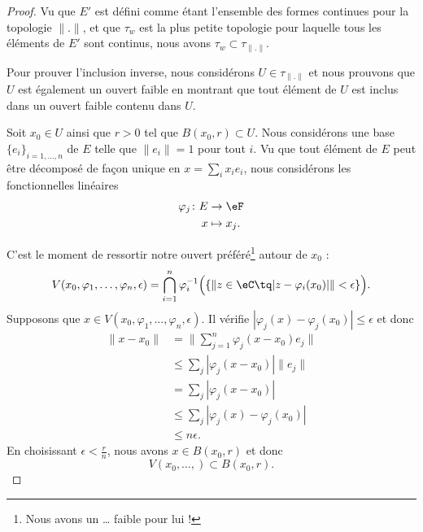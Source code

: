 \begin{proof}
	Vu que \( E'\) est défini comme étant l'ensemble des formes continues pour la topologie \( \| . \|\), et que \( \tau_w\) est la plus petite topologie pour laquelle tous les éléments de \( E'\) sont continus, nous avons \( \tau_w\subset\tau_{\| . \|}\).

	Pour prouver l'inclusion inverse, nous considérons \( U\in\tau_{\| . \|}\) et nous prouvons que \( U\) est également un ouvert faible en montrant que tout élément de $U$ est inclus dans un ouvert faible contenu dans \( U\).


	Soit \( x_0\in U\) ainsi que \( r>0\) tel que \( B(x_0,r)\subset U\). Nous considérons une base \( \{ e_i \}_{i=1,\ldots, n}\) de \( E\) telle que \( \| e_i \|=1\) pour tout \( i\). Vu que tout élément de \( E\) peut être décomposé de façon unique en \( x=\sum_ix_ie_i\), nous considérons les fonctionnelles linéaires
	\begin{equation}
		\begin{aligned}
			\varphi_j\colon E & \to \eF      \\
			x                 & \mapsto x_j.
		\end{aligned}
	\end{equation}

	C'est le moment de ressortir notre ouvert préféré\footnote{Nous avons un \ldots{} faible pour lui !} autour de \( x_0\) :
	\begin{equation}
		V(x_0,\varphi_1,\ldots, \varphi_n,\epsilon)=\bigcap_{i=1}^n\varphi_i^{-1}\Big( \{  \| z\in \eC\tq | z-\varphi_i(x_0) | \|<\epsilon  \} \Big).
	\end{equation}
	Supposons que \( x\in V(x_0,\varphi_1,\ldots, \varphi_n,\epsilon)\). Il vérifie \( | \varphi_j(x)-\varphi_j(x_0) |\leq \epsilon\) et donc
	\begin{subequations}
		\begin{align}
			\| x-x_0 \| & =\| \sum_{j=1}^n\varphi_j(x-x_0)e_j \|     \\
			            & \leq \sum_j| \varphi_j(x-x_0) |\| e_j \|   \\
			            & = \sum_j| \varphi_j(x-x_0) |               \\
			            & \leq \sum_j| \varphi_j(x)-\varphi_j(x_0) | \\
			            & \leq n\epsilon.
		\end{align}
	\end{subequations}
	En choisissant \( \epsilon<\frac{ r }{ n }\), nous avons \( x\in B(x_0,r)\) et donc
	\begin{equation}
		V(x_0,\ldots, )\subset B(x_0,r).
	\end{equation}
\end{proof}

